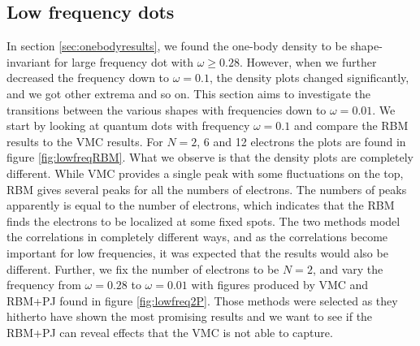 \newpage
\subsection{Low frequency dots} \label{sec:lowfrequencies}
In section \ref{sec:onebodyresults}, we found the one-body density to be shape-invariant for large frequency dot with $\omega\geq0.28$. However, when we further decreased the frequency down to $\omega=0.1$, the density plots changed significantly, and we got other extrema and so on. This section aims to investigate the transitions between the various shapes with frequencies down to $\omega=0.01$. We start by looking at quantum dots with frequency $\omega=0.1$ and compare the RBM results to the VMC results. For $N=2$, 6 and 12 electrons the plots are found in figure \eqref{fig:lowfreqRBM}. What we observe is that the density plots are completely different. While VMC provides a single peak with some fluctuations on the top, RBM gives several peaks for all the numbers of electrons. The numbers of peaks apparently is equal to the number of electrons, which indicates that the RBM finds the electrons to be localized at some fixed spots. The two methods model the correlations in completely different ways, and as the correlations become important for low frequencies, it was expected that the results would also be different. Further, we fix the number of electrons to be $N=2$, and vary the frequency from $\omega=0.28$ to $\omega=0.01$ with figures produced by VMC and RBM+PJ found in figure \eqref{fig:lowfreq2P}. Those methods were selected as they hitherto have shown the most promising results and we want to see if the RBM+PJ can reveal effects that the VMC is not able to capture.
